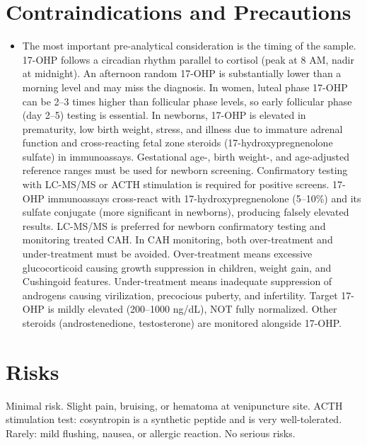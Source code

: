 \section*{Contraindications and Precautions}
\begin{itemize}
  \item The most important pre-analytical consideration is the timing of the sample. 17-OHP follows a circadian rhythm parallel to cortisol (peak at 8 AM, nadir at midnight). An afternoon random 17-OHP is substantially lower than a morning level and may miss the diagnosis. In women, luteal phase 17-OHP can be 2--3 times higher than follicular phase levels, so early follicular phase (day 2--5) testing is essential. In newborns, 17-OHP is elevated in prematurity, low birth weight, stress, and illness due to immature adrenal function and cross-reacting fetal zone steroids (17-hydroxypregnenolone sulfate) in immunoassays. Gestational age-, birth weight-, and age-adjusted reference ranges must be used for newborn screening. Confirmatory testing with LC-MS/MS or ACTH stimulation is required for positive screens. 17-OHP immunoassays cross-react with 17-hydroxypregnenolone (5--10\%) and its sulfate conjugate (more significant in newborns), producing falsely elevated results. LC-MS/MS is preferred for newborn confirmatory testing and monitoring treated CAH. In CAH monitoring, both over-treatment and under-treatment must be avoided. Over-treatment means excessive glucocorticoid causing growth suppression in children, weight gain, and Cushingoid features. Under-treatment means inadequate suppression of androgens causing virilization, precocious puberty, and infertility. Target 17-OHP is mildly elevated (200--1000 ng/dL), NOT fully normalized. Other steroids (androstenedione, testosterone) are monitored alongside 17-OHP.
\end{itemize}
\section*{Risks}
Minimal risk. Slight pain, bruising, or hematoma at venipuncture site. ACTH stimulation test: cosyntropin is a synthetic peptide and is very well-tolerated. Rarely: mild flushing, nausea, or allergic reaction. No serious risks.

